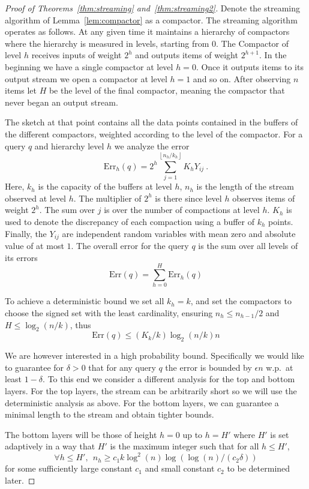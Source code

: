 \documentclass[anon,12pt]{colt2019} %
\newcommand{\eps}{\epsilon}
\newcommand{\floor}[1]{\left \lfloor #1 \right \rfloor}
\begin{document}
\begin{proof} [Proof of Theorems~\ref{thm:streaming} and~\ref{thm:streaming2}]
Denote the streaming algorithm of Lemma~\ref{lem:compactor} as a compactor. The streaming algorithm operates as follows. At any given time it maintains a hierarchy of compactors where the hierarchy is measured in levels, starting from 0. The Compactor of level $h$ receives inputs of weight $2^h$ and outputs items of weight $2^{h+1}$. In the beginning we have a single compactor at level $h=0$. Once it outputs items to its output stream we open a compactor at level $h=1$ and so on. After observing $n$ items let $H$ be the level of the final compactor, meaning the compactor that never began an output stream.

The sketch at that point contains all the data points contained in the buffers of the different compactors, weighted according to the level of the compactor. For a query $q$ and hierarchy level $h$ we analyze the error
$$\text{Err}_h(q) = 2^h \sum_{j=1}^{\floor{n_h/k_h} } K_h Y_{ij} \ .$$
Here, $k_h$ is the capacity of the buffers at level $h$, $n_h$ is the length of the stream observed at level $h$. The multiplier of $2^h$ is there since level $h$ observes items of weight $2^h$. The sum over $j$ is over the number of compactions at level $h$. $K_h$ is used to denote the discrepancy of each compaction using a buffer of $k_h$ points. Finally, the $Y_{ij}$ are independent random variables with mean zero and absolute value of at most $1$. The overall error for the query $q$ is the sum over all levels of its errors
$$ \text{Err}(q) = \sum_{h=0}^H \text{Err}_h(q)$$

To achieve a deterministic bound we set all $k_h=k$, and set the compactors to choose the signed set with the least cardinality, ensuring $n_h \leq n_{h-1}/2$ and $H \leq \log_2(n/k)$, thus
$$ \text{Err}(q) \leq (K_k/k) \log_2(n/k) n $$

We are however interested in a high probability bound. Specifically we would like to guarantee for $\delta > 0$ that for any query $q$ the error is bounded by $\eps n$ w.p.\ at least $1-\delta$. To this end we consider a different analysis for the top and bottom layers. For the top layers, the stream can be arbitrarily short so we will use the deterministic analysis as above. For the bottom layers, we can guarantee a minimal length to the stream and obtain tighter bounds.

The bottom layers will be those of height $h=0$ up to $h=H'$ where $H'$ is set adaptively in a way that $H'$ is the maximum integer such that for all $h \leq H'$, 
\begin{equation} \label{eq:Htag_nh}
 \forall h \leq H' , \ \ n_h \geq c_1 k \log^2(n) \log(\log(n)/(c_2 \delta ))
\end{equation}
for some sufficiently large constant $c_1$ and small constant $c_2$ to be determined later.


\end{proof}
\end{document}
